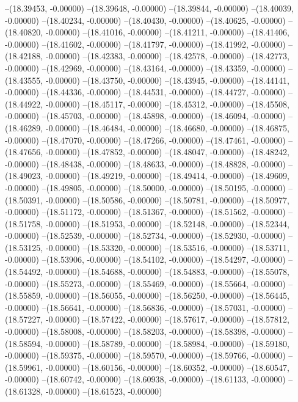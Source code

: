 --(18.39453, -0.00000)
--(18.39648, -0.00000)
--(18.39844, -0.00000)
--(18.40039, -0.00000)
--(18.40234, -0.00000)
--(18.40430, -0.00000)
--(18.40625, -0.00000)
--(18.40820, -0.00000)
--(18.41016, -0.00000)
--(18.41211, -0.00000)
--(18.41406, -0.00000)
--(18.41602, -0.00000)
--(18.41797, -0.00000)
--(18.41992, -0.00000)
--(18.42188, -0.00000)
--(18.42383, -0.00000)
--(18.42578, -0.00000)
--(18.42773, -0.00000)
--(18.42969, -0.00000)
--(18.43164, -0.00000)
--(18.43359, -0.00000)
--(18.43555, -0.00000)
--(18.43750, -0.00000)
--(18.43945, -0.00000)
--(18.44141, -0.00000)
--(18.44336, -0.00000)
--(18.44531, -0.00000)
--(18.44727, -0.00000)
--(18.44922, -0.00000)
--(18.45117, -0.00000)
--(18.45312, -0.00000)
--(18.45508, -0.00000)
--(18.45703, -0.00000)
--(18.45898, -0.00000)
--(18.46094, -0.00000)
--(18.46289, -0.00000)
--(18.46484, -0.00000)
--(18.46680, -0.00000)
--(18.46875, -0.00000)
--(18.47070, -0.00000)
--(18.47266, -0.00000)
--(18.47461, -0.00000)
--(18.47656, -0.00000)
--(18.47852, -0.00000)
--(18.48047, -0.00000)
--(18.48242, -0.00000)
--(18.48438, -0.00000)
--(18.48633, -0.00000)
--(18.48828, -0.00000)
--(18.49023, -0.00000)
--(18.49219, -0.00000)
--(18.49414, -0.00000)
--(18.49609, -0.00000)
--(18.49805, -0.00000)
--(18.50000, -0.00000)
--(18.50195, -0.00000)
--(18.50391, -0.00000)
--(18.50586, -0.00000)
--(18.50781, -0.00000)
--(18.50977, -0.00000)
--(18.51172, -0.00000)
--(18.51367, -0.00000)
--(18.51562, -0.00000)
--(18.51758, -0.00000)
--(18.51953, -0.00000)
--(18.52148, -0.00000)
--(18.52344, -0.00000)
--(18.52539, -0.00000)
--(18.52734, -0.00000)
--(18.52930, -0.00000)
--(18.53125, -0.00000)
--(18.53320, -0.00000)
--(18.53516, -0.00000)
--(18.53711, -0.00000)
--(18.53906, -0.00000)
--(18.54102, -0.00000)
--(18.54297, -0.00000)
--(18.54492, -0.00000)
--(18.54688, -0.00000)
--(18.54883, -0.00000)
--(18.55078, -0.00000)
--(18.55273, -0.00000)
--(18.55469, -0.00000)
--(18.55664, -0.00000)
--(18.55859, -0.00000)
--(18.56055, -0.00000)
--(18.56250, -0.00000)
--(18.56445, -0.00000)
--(18.56641, -0.00000)
--(18.56836, -0.00000)
--(18.57031, -0.00000)
--(18.57227, -0.00000)
--(18.57422, -0.00000)
--(18.57617, -0.00000)
--(18.57812, -0.00000)
--(18.58008, -0.00000)
--(18.58203, -0.00000)
--(18.58398, -0.00000)
--(18.58594, -0.00000)
--(18.58789, -0.00000)
--(18.58984, -0.00000)
--(18.59180, -0.00000)
--(18.59375, -0.00000)
--(18.59570, -0.00000)
--(18.59766, -0.00000)
--(18.59961, -0.00000)
--(18.60156, -0.00000)
--(18.60352, -0.00000)
--(18.60547, -0.00000)
--(18.60742, -0.00000)
--(18.60938, -0.00000)
--(18.61133, -0.00000)
--(18.61328, -0.00000)
--(18.61523, -0.00000)
